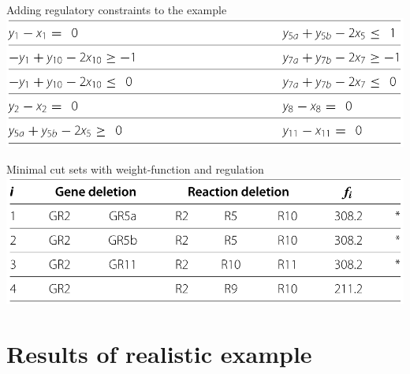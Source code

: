 \documentclass{beamer}
\begin{document}
\begin{frame}{Adding regulatory constraints to the example}
    \includegraphics[width=1\textwidth]{grafik/table4} \\
\end{frame}

\begin{frame}{Minimal cut sets with weight-function and regulation}
    \includegraphics[width=1\textwidth]{grafik/table5}    
\end{frame}

\section{Results of realistic example}
\end{document}
